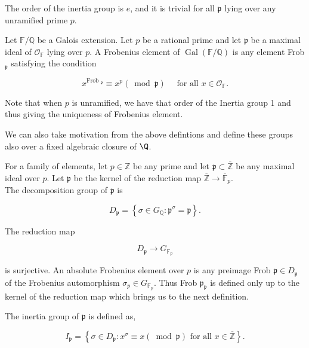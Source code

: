 The order of the inertia group is $e$, and it is trivial for all $\mathfrak{p}$ lying over any unramified prime $p$. \\

\begin{definition}
    Let $\mathbb{F} / \mathbb{Q}$ be a Galois extension. Let $p$ be a rational prime and let $\mathfrak{p}$ be a maximal ideal of $\mathcal{O}_{\mathbb{F}}$ lying over $p$. A Frobenius element of $\operatorname{Gal}(\mathbb{F} / \mathbb{Q})$ is any element Frob $_{\mathfrak{p}}$ satisfying the condition

$$
x^{\text {Frob }_{\mathfrak{p}}} \equiv x^{p}(\bmod \mathfrak{p}) \quad \text { for all } x \in \mathcal{O}_{\mathbb{F}} .
$$

\end{definition}

Note that when $p$ is unramified, we have that order of the Inertia group 1 and thus giving the uniqueness of Frobenius element. 

We can also take motivation from the above defintions and define these groups also over a fixed algebraic closure of $\Q$. 

\begin{definition}
    For a family of elements, let $p \in \mathbb{Z}$ be any prime and let $\mathfrak{p} \subset \overline{\mathbb{Z}}$ be any maximal ideal over $p$. Let $\mathfrak{p}$ be the kernel of the reduction map $\overline{\mathbb{Z}} \longrightarrow \overline{\mathbb{F}}_{p}$. \\
    
    The decomposition group of $\mathfrak{p}$ is

$$
D_{\mathfrak{p}}=\left\{\sigma \in G_{\mathbb{Q}}: \mathfrak{p}^{\sigma}=\mathfrak{p}\right\} .
$$

\end{definition}

The reduction map

$$
D_{\mathfrak{p}} \longrightarrow G_{\mathbb{F}_{p}}
$$

is surjective. An absolute Frobenius element over $p$ is any preimage Frob $\mathfrak{p} \in D_{\mathfrak{p}}$ of the Frobenius automorphism $\sigma_{p} \in G_{\mathbb{F}_{p}}$. Thus Frob $\mathfrak{p}_{\mathfrak{p}}$ is defined only up to the kernel of the reduction map which brings  us to the next definition. 

\begin{definition}
     The inertia group of $\mathfrak{p}$ is defined as,

$$
I_{\mathfrak{p}}=\left\{\sigma \in D_{\mathfrak{p}}: x^{\sigma} \equiv x(\bmod \mathfrak{p}) \text { for all } x \in \overline{\mathbb{Z}}\right\} .
$$
\end{definition}

